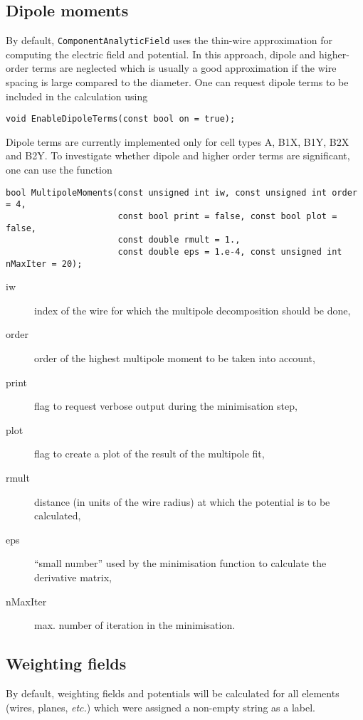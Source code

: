 \subsection{Dipole moments}
By default, \texttt{ComponentAnalyticField} uses the thin-wire approximation
for computing the electric field and potential. In this approach, 
dipole and higher-order terms are neglected which is usually a good   
approximation if the wire spacing is large compared to the diameter.
One can request dipole terms to be included in the calculation using
\begin{lstlisting}
void EnableDipoleTerms(const bool on = true);
\end{lstlisting}
Dipole terms are currently implemented only for cell types 
A, B1X, B1Y, B2X and B2Y.
To investigate whether dipole and higher order terms are significant, 
one can use the function
\begin{lstlisting}
bool MultipoleMoments(const unsigned int iw, const unsigned int order = 4,
                      const bool print = false, const bool plot = false, 
                      const double rmult = 1.,
                      const double eps = 1.e-4, const unsigned int nMaxIter = 20);
\end{lstlisting} 
\begin{description}
  \item[iw] index of the wire for which the multipole decomposition should be done,
  \item[order] order of the highest multipole moment to be taken into account,
  \item[print] flag to request verbose output during the minimisation step,
  \item[plot] flag to create a plot of the result of the multipole fit,
  \item[rmult] distance (in units of the wire radius) at which the potential 
               is to be calculated,
  \item[eps] ``small number'' used by the minimisation function to calculate the derivative matrix,
  \item[nMaxIter] max. number of iteration in the minimisation.
\end{description}

\subsection{Weighting fields}

By default, weighting fields and potentials will be calculated for 
all elements (wires, planes, \textit{etc.}) which were assigned a 
non-empty string as a label.

